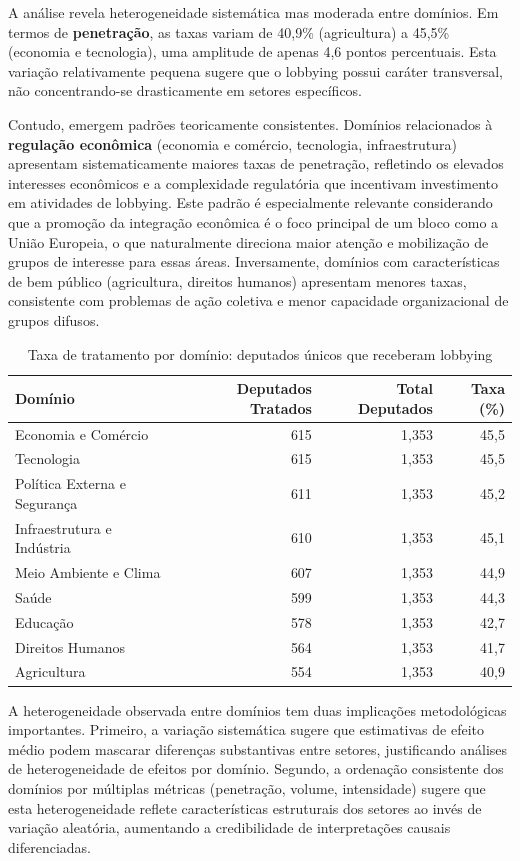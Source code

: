 A análise revela heterogeneidade sistemática mas moderada entre domínios. Em termos de \textbf{penetração}, as taxas variam de 40,9\% (agricultura) a 45,5\% (economia e tecnologia), uma amplitude de apenas 4,6 pontos percentuais. Esta variação relativamente pequena sugere que o lobbying possui caráter transversal, não concentrando-se drasticamente em setores específicos.

Contudo, emergem padrões teoricamente consistentes. Domínios relacionados à \textbf{regulação econômica} (economia e comércio, tecnologia, infraestrutura) apresentam sistematicamente maiores taxas de penetração, refletindo os elevados interesses econômicos e a complexidade regulatória que incentivam investimento em atividades de lobbying. Este padrão é especialmente relevante considerando que a promoção da integração econômica é o foco principal de um bloco como a União Europeia, o que naturalmente direciona maior atenção e mobilização de grupos de interesse para essas áreas. Inversamente, domínios com características de bem público (agricultura, direitos humanos) apresentam menores taxas, consistente com problemas de ação coletiva e menor capacidade organizacional de grupos difusos.

\begin{table}[htbp]
\centering
\caption{Taxa de tratamento por domínio: deputados únicos que receberam lobbying}
\label{tab:domain_treatment_rates}
\begin{tabular}{lrrr}
\toprule
\textbf{Domínio} & \textbf{Deputados Tratados} & \textbf{Total Deputados} & \textbf{Taxa (\%)} \\
\midrule
Economia e Comércio & 615 & 1{,}353 & 45{,}5 \\
Tecnologia & 615 & 1{,}353 & 45{,}5 \\
Política Externa e Segurança & 611 & 1{,}353 & 45{,}2 \\
Infraestrutura e Indústria & 610 & 1{,}353 & 45{,}1 \\
Meio Ambiente e Clima & 607 & 1{,}353 & 44{,}9 \\
Saúde & 599 & 1{,}353 & 44{,}3 \\
Educação & 578 & 1{,}353 & 42{,}7 \\
Direitos Humanos & 564 & 1{,}353 & 41{,}7 \\
Agricultura & 554 & 1{,}353 & 40{,}9 \\
\bottomrule
\end{tabular}
\end{table}


A heterogeneidade observada entre domínios tem duas implicações metodológicas importantes. Primeiro, a variação sistemática sugere que estimativas de efeito médio podem mascarar diferenças substantivas entre setores, justificando análises de heterogeneidade de efeitos por domínio. Segundo, a ordenação consistente dos domínios por múltiplas métricas (penetração, volume, intensidade) sugere que esta heterogeneidade reflete características estruturais dos setores ao invés de variação aleatória, aumentando a credibilidade de interpretações causais diferenciadas.

